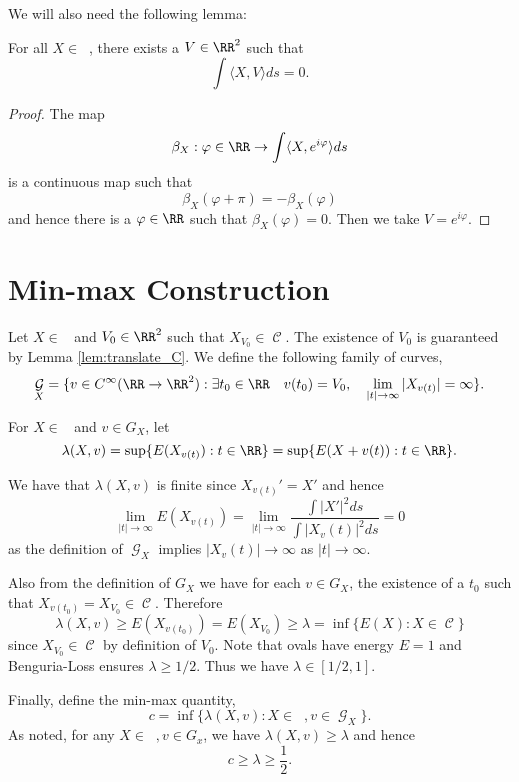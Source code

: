 \documentclass[12pt]{article}
\DeclareMathOperator{\HS}{\mathcal{H}}
\DeclareMathOperator{\HSnc}{\HS_0}
\DeclareMathOperator{\C}{\mathcal{C}}
\DeclareMathOperator{\G}{\mathcal{G}}
\begin{document}
We will also need the following lemma:

\begin{lemma}
\label{lem:projection_C}
For all \(X \in \HSnc\), there exists a \(V \in \RR^2\) such that
\[
\int \langle X, V \rangle ds = 0.
\]
\end{lemma}

\begin{proof}
The map
\[
\beta_X : \varphi \in \RR \to \int \langle X, e^{i\varphi} \rangle ds
\]
is a continuous map such that
\[
\beta_X(\varphi + \pi) = -\beta_X(\varphi)
\]
and hence there is a \(\varphi \in \RR\) such that \(\beta_X(\varphi) = 0\). Then we take \(V = e^{i\varphi}\).
\end{proof}

\section{Min-max Construction}
\label{sec-2}

Let \(X \in \HSnc\) and \(V_0 \in \RR^2\) such that \(X_{V_0} \in \C\). The existence of \(V_0\) is guaranteed by Lemma \ref{lem:translate_C}. We define the following family of curves,
\[
\G_X = \lbrace v \in C^{\infty}(\RR \to \RR^2) : \exists t_0 \in \RR \quad v(t_0) = V_0, \quad \lim_{|t| \to \infty} |X_{v(t)}| = \infty \rbrace.
\]

For \(X \in \HSnc\) and \(v \in G_X\), let
\[
\lambda(X, v) = \sup \lbrace E(X_{v(t)}) : t \in \RR \rbrace = \sup \lbrace E(X + v(t)) : t \in \RR \rbrace.
\]

We have that \(\lambda(X, v)\) is finite since \(X_{v(t)}' = X'\) and hence
\[
\lim_{|t| \to \infty} E(X_{v(t)}) = \lim_{|t| \to \infty} \frac{\int |X'|^2 ds}{\int |X_v(t)|^2 ds} = 0
\]
as the definition of \(\G_X\) implies \(|X_v(t)| \to \infty\) as \(|t| \to \infty\).

Also from the definition of \(G_X\) we have for each \(v \in G_X\), the existence of a \(t_0\) such that \(X_{v(t_0)} = X_{V_0} \in \C\). Therefore
\[
\lambda(X, v) \geq E(X_{v(t_0)}) = E(X_{V_0}) \geq \lambda = \inf\lbrace E(X) : X \in \C\rbrace
\]
since \(X_{V_0} \in \C\) by definition of \(V_0\). Note that ovals have energy \(E = 1\) and Benguria-Loss ensures \(\lambda \geq 1/2\). Thus we have \(\lambda \in [1/2, 1]\).

Finally, define the min-max quantity,
\[
c = \inf \lbrace \lambda(X, v) : X \in \HSnc, v \in \G_X \rbrace.
\]
As noted, for any \(X \in \HSnc, v \in G_x\), we have \(\lambda(X, v) \geq \lambda\) and hence
\[
c \geq \lambda \geq \frac{1}{2}.
\]
\end{document}
